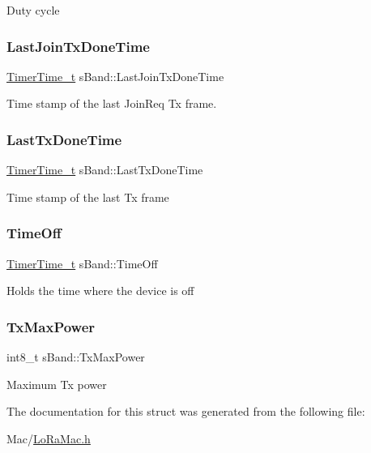 Duty cycle \mbox{\label{structsBand_a82a8833c760fdd7052930c8ce585fee5}} 
\subsubsection{\texorpdfstring{Last\+Join\+Tx\+Done\+Time}{LastJoinTxDoneTime}}
{\footnotesize\ttfamily \hyperlink{utilities_8h_a4215ca43d3e953099ea758ce428599d0}{Timer\+Time\+\_\+t} s\+Band\+::\+Last\+Join\+Tx\+Done\+Time}

Time stamp of the last Join\+Req Tx frame. \mbox{\label{structsBand_a4c17433b9d28fd19439b5952faa1596c}} 
\subsubsection{\texorpdfstring{Last\+Tx\+Done\+Time}{LastTxDoneTime}}
{\footnotesize\ttfamily \hyperlink{utilities_8h_a4215ca43d3e953099ea758ce428599d0}{Timer\+Time\+\_\+t} s\+Band\+::\+Last\+Tx\+Done\+Time}

Time stamp of the last Tx frame \mbox{\label{structsBand_af2d2176d9685c6021363cf06ecbbe3fc}} 
\subsubsection{\texorpdfstring{Time\+Off}{TimeOff}}
{\footnotesize\ttfamily \hyperlink{utilities_8h_a4215ca43d3e953099ea758ce428599d0}{Timer\+Time\+\_\+t} s\+Band\+::\+Time\+Off}

Holds the time where the device is off \mbox{\label{structsBand_abb03fade023a9d7fe2e4e7ade9ebc31a}} 
\subsubsection{\texorpdfstring{Tx\+Max\+Power}{TxMaxPower}}
{\footnotesize\ttfamily int8\+\_\+t s\+Band\+::\+Tx\+Max\+Power}

Maximum Tx power 

The documentation for this struct was generated from the following file\+:\begin{DoxyCompactItemize}
\item 
Mac/\hyperlink{LoRaMac_8h}{Lo\+Ra\+Mac.\+h}\end{DoxyCompactItemize}
